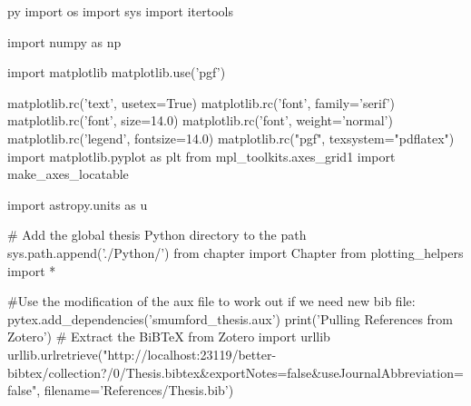 \usepackage{pythontex}

\begin{pythontexcustomcode}[begin]{py}
import os
import sys
import itertools

import numpy as np

import matplotlib
matplotlib.use('pgf')

matplotlib.rc('text', usetex=True)
matplotlib.rc('font', family='serif')
matplotlib.rc('font', size=14.0)
matplotlib.rc('font', weight='normal')
matplotlib.rc('legend', fontsize=14.0)
matplotlib.rc("pgf", texsystem="pdflatex")
import matplotlib.pyplot as plt
from mpl_toolkits.axes_grid1 import make_axes_locatable

import astropy.units as u

# Add the global thesis Python directory to the path
sys.path.append('./Python/')
from chapter import Chapter
from plotting_helpers import *

\end{pythontexcustomcode}

\begin{pycode}[refs]
#Use the modification of the aux file to work out if we need new bib file:
pytex.add_dependencies('smumford_thesis.aux')
print('Pulling References from Zotero')
# Extract the BiBTeX from Zotero
import urllib
urllib.urlretrieve("http://localhost:23119/better-bibtex/collection?/0/Thesis.bibtex&exportNotes=false&useJournalAbbreviation=false", filename='References/Thesis.bib')
\end{pycode}

